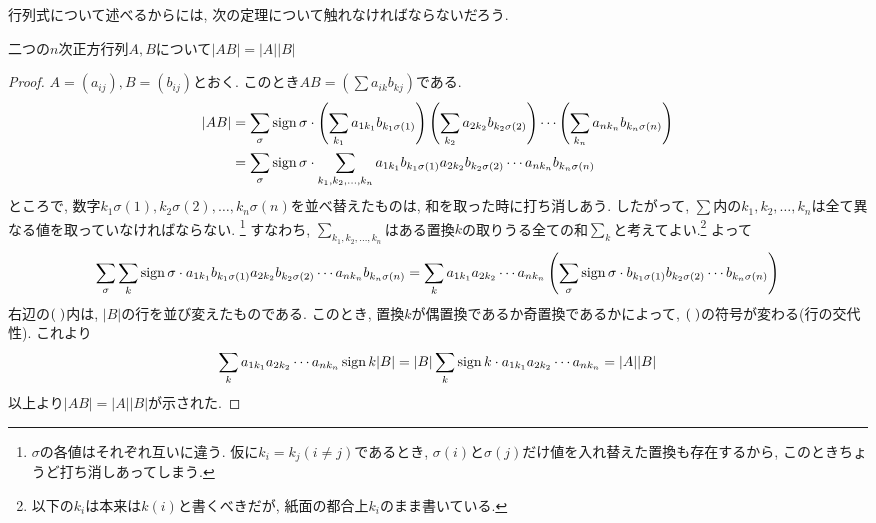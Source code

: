         行列式について述べるからには, 次の定理について触れなければならないだろう.
        \begin{screen}
            二つの$n$次正方行列$A,B$について$|AB|=|A||B|$
        \end{screen}
        \begin{proof}
            $A=(a_{ij}),B=(b_{ij})$とおく. このとき$AB=(\sum a_{ik}b_{kj})$である.
            \begin{align*}
                |AB|&=\sum_{\sigma}\mathop{\mathrm{sign}}\nolimits\sigma\cdot \left(\sum_{k_1}a_{1k_1}b_{k_1\sigma(1)}\right)\left(\sum_{k_2}a_{2k_2}b_{k_2\sigma(2)}\right)\cdots\left(\sum_{k_n}a_{nk_n}b_{k_n\sigma(n)}\right)\\
                &=\sum_{\sigma}\mathop{\mathrm{sign}}\nolimits\sigma\cdot \sum_{k_1,k_2,\dots,k_n}a_{1k_1}b_{k_1\sigma(1)}a_{2k_2}b_{k_2\sigma(2)}\cdots a_{nk_n}b_{k_n\sigma(n)}
            \end{align*}
            ところで, 数字$k_1\sigma(1),k_2\sigma(2),\dots,k_n\sigma(n)$を並べ替えたものは, 和を取った時に打ち消しあう. したがって, $\sum$内の$k_1,k_2,\dots,k_n$は全て異なる値を取っていなければならない.
            \footnote{$\sigma$の各値はそれぞれ互いに違う. 仮に$k_i=k_j(i\neq j)$であるとき, $\sigma(i)$と$\sigma(j)$だけ値を入れ替えた置換も存在するから, このときちょうど打ち消しあってしまう.}
            すなわち, $\sum\limits_{k_1,k_2,\dots,k_n}$はある置換$k$の取りうる全ての和$\sum\limits_{k}$と考えてよい.\footnote{以下の$k_i$は本来は$k(i)$と書くべきだが, 紙面の都合上$k_i$のまま書いている.}  よって
            \begin{equation*}
                \sum_{\sigma}\sum_{k}\mathop{\mathrm{sign}}\nolimits\sigma\cdot a_{1k_1}b_{k_1\sigma(1)}a_{2k_2}b_{k_2\sigma(2)}\cdots a_{nk_n}b_{k_n\sigma(n)}=\sum_{k}a_{1k_1}a_{2k_2}\cdots a_{nk_n}\left(\sum_{\sigma}\mathop{\mathrm{sign}}\nolimits \sigma\cdot b_{k_1\sigma(1)}b_{k_2\sigma(2)}\cdots b_{k_n\sigma(n)}\right)
            \end{equation*}
            右辺の$(\hspace{1mm})$内は, $|B|$の行を並び変えたものである. このとき, 置換$k$が偶置換であるか奇置換であるかによって, $(\hspace{1mm})$の符号が変わる(行の交代性). これより
            \begin{equation*}
                \sum_{k}a_{1k_1}a_{2k_2}\cdots a_{nk_n}\mathop{\mathrm{sign}}\nolimits k|B|=|B|\sum_{k}\mathop{\mathrm{sign}}\nolimits k\cdot a_{1k_1}a_{2k_2}\cdots a_{nk_n}=|A||B|
            \end{equation*} 
            以上より$|AB|=|A||B|$が示された.
        \end{proof}
        \clearpage
